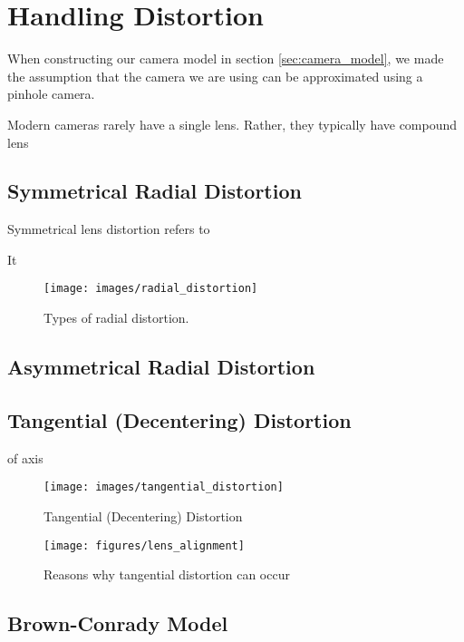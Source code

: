 \section{Handling Distortion}

When constructing our camera model in section \ref{sec:camera_model}, we made the assumption that the camera we are using can be approximated using a pinhole camera.


Modern cameras rarely have a single lens. Rather, they typically have compound lens




\subsection{Symmetrical Radial Distortion}

Symmetrical lens distortion refers to

It


\begin{figure}[h!]
    \centering
    \texttt{[image: images/radial\_distortion]}
    \caption{Types of radial distortion.}
\end{figure}

\subsection{Asymmetrical Radial Distortion}

\subsection{Tangential (Decentering) Distortion}

of axis

\begin{figure}[h!]
    \centering
    \texttt{[image: images/tangential\_distortion]}
    \caption{Tangential (Decentering) Distortion}
\end{figure}

\begin{figure}[h!]
    \centering
    \texttt{[image: figures/lens\_alignment]}
    \caption{Reasons why tangential distortion can occur}
\end{figure}

\subsection{Brown-Conrady Model}
